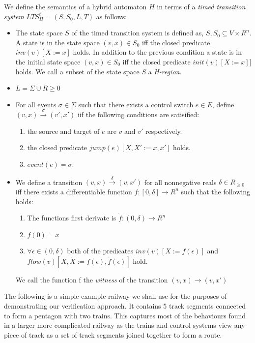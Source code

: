 \medskip
\begin{mydef}
We define the semantics of a hybrid automaton $H$ in terms of a \emph{timed transition system} $LTS^t_H = (S,S_0,L,T)$ as follows:


\begin{itemize}
 
\item The state space $S$ of the timed transition system is defined as, $S, S_0 \subseteq V \times R^n$. A state is in the state space $(v,x) \in S_0$ iff the closed predicate $inv(v)[X := x]$ holds. In addition to the previous condition a state is in the initial state space $(v,x) \in S_0$ iff the closed predicate $init(v)[X := x]]$ holds. We call a subset of the state space $S$ a \emph{H-region}.


\item $L = \Sigma \cup R {\geq 0}$

\item For all events $\sigma \in \Sigma$ such that there exists a control switch $e \in E$, define $(v,x) \xrightarrow{\sigma} (v',x')$ iif the following conditions are satisified:
\begin{enumerate}
\item the source and target of $e$ are $v$ and $v'$ respectively. 
\item the closed predicate $jump(e)[X, X' := x,x']$ holds.
\item $event(e) = \sigma$.
\end{enumerate}

\item We define a transition $(v,x) \xrightarrow{\delta} (v,x')$ for all nonnegative reals $\delta \in R_{\geq 0}$ iff there exists a differentiable function $f: [0, \delta] \to R^n$ such that the following holds:
\begin{enumerate}
\item The functions first derivate is $\dot{f} :(0,\delta) \to R^n$
\item $f(0) = x$
\item $\forall \epsilon \in (0,\delta)$ both of the predicates $inv(v)[X := f(\epsilon)]$ and $flow(v)[X,\dot{X} := f(\epsilon),\dot{f}(\epsilon)]$ hold.
\end{enumerate}
We call the function f the \emph{witness} of the transition $(v,x) \to (v, x')$

\end{itemize}


\end{mydef}
\medskip
The following is a simple example railway we shall use for the purposes of demonstrating our verification approach.  It contains 5 track segments connected to form a pentagon with two trains. This captures most of the behaviours found in a larger more complicated railway as the trains and control systems view any piece of track as a set of track segments joined together to form a route.

